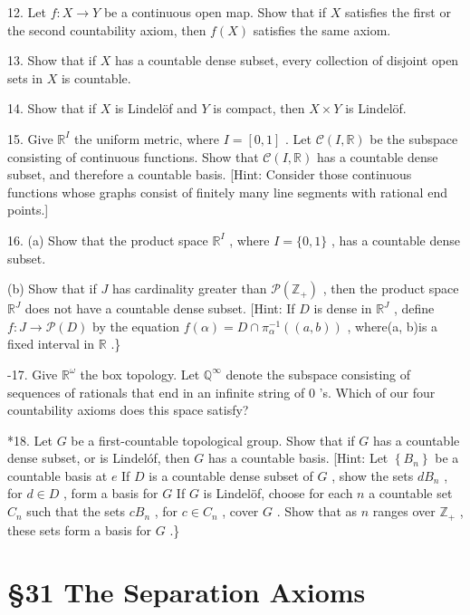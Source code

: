 12. Let \(f : X \rightarrow  Y\) be a continuous open map. Show that if \(X\) satisfies the first or the second countability axiom, then \(f\left( X\right)\) satisfies the same axiom.

13. Show that if \(X\) has a countable dense subset, every collection of disjoint open sets in \(X\) is countable.

14. Show that if \(X\) is Lindelöf and \(Y\) is compact, then \(X \times  Y\) is Lindelöf.

15. Give \({\mathbb{R}}^{I}\) the uniform metric, where \(I = \left\lbrack  {0,1}\right\rbrack\) . Let \(\mathcal{C}\left( {I,\mathbb{R}}\right)\) be the subspace consisting of continuous functions. Show that \(\mathcal{C}\left( {I,\mathbb{R}}\right)\) has a countable dense subset, and therefore a countable basis. [Hint: Consider those continuous functions whose graphs consist of finitely many line segments with rational end points.]

16. (a) Show that the product space \({\mathbb{R}}^{I}\) , where \(I = \{ 0,1\}\) , has a countable dense subset.

(b) Show that if \(J\) has cardinality greater than \(\mathcal{P}\left( {\mathbb{Z}}_{ + }\right)\) , then the product space \({\mathbb{R}}^{J}\) does not have a countable dense subset. [Hint: If \(D\) is dense in \({\mathbb{R}}^{J}\) , define \(f : J \rightarrow  \mathcal{P}\left( D\right)\) by the equation \(f\left( \alpha \right)  = D \cap  {\pi }_{\alpha }^{-1}\left( \left( {a,b}\right) \right)\) , where(a, b)is a fixed interval in \(\mathbb{R}\) .\}

-17. Give \({\mathbb{R}}^{\omega }\) the box topology. Let \({\mathbb{Q}}^{\infty }\) denote the subspace consisting of sequences of rationals that end in an infinite string of 0 's. Which of our four countability axioms does this space satisfy?

*18. Let \(G\) be a first-countable topological group. Show that if \(G\) has a countable dense subset, or is Lindelóf, then \(G\) has a countable basis. [Hint: Let \(\left\{  {B}_{n}\right\}\) be a countable basis at \(e\) If \(D\) is a countable dense subset of \(G\) , show the sets \(d{B}_{n}\) , for \(d \in  D\) , form a basis for \(G\) If \(G\) is Lindelöf, choose for each \(n\) a countable set \({C}_{n}\) such that the sets \(c{B}_{n}\) , for \(c \in  {C}_{n}\) , cover \(G\) . Show that as \(n\) ranges over \({\mathbb{Z}}_{ + }\) , these sets form a basis for \(G\) .\}

\section*{§31 The Separation Axioms}


